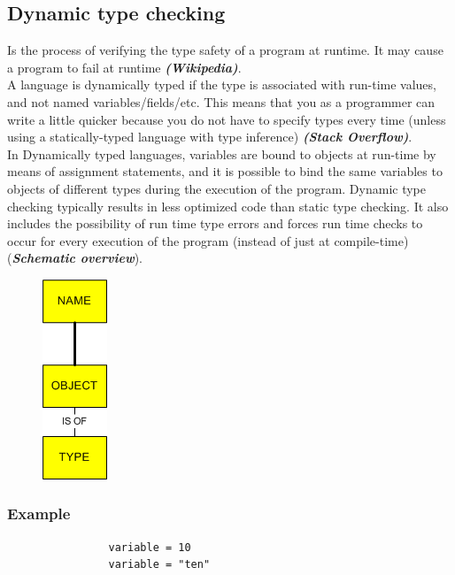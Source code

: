 \documentclass[12pt]{article}
\begin{document}
	\subsection{Dynamic type checking}
		Is the process of verifying the type safety of a program at runtime. It may cause a program to fail at runtime \textit{\textbf{(Wikipedia)}}.\\
		A language is dynamically typed if the type is associated with run-time values, and not named variables/fields/etc. This means that you as a programmer can write a little quicker because you do not have to specify types every time (unless using a statically-typed language with type inference) \textit{\textbf{(Stack Overflow)}}.\\
		In Dynamically typed languages, variables are bound to objects at run-time by means of assignment statements, and it is possible to bind the same variables to objects of different types during the execution of the program.
		Dynamic type checking typically results in less optimized code than static type checking. It also includes the possibility of run time type errors and forces run time checks to occur for every execution of the program (instead of just at compile-time) (\textbf{\textit{Schematic overview}}).\\
		
		\begin{figure}[h!]
			\centering
			\includegraphics[scale=0.60]{img/dynamic.png}
		\end{figure}
	
		\subsubsection{Example}
			\begin{lstlisting}
				variable = 10
				variable = "ten"
			\end{lstlisting}
		
\end{document}

